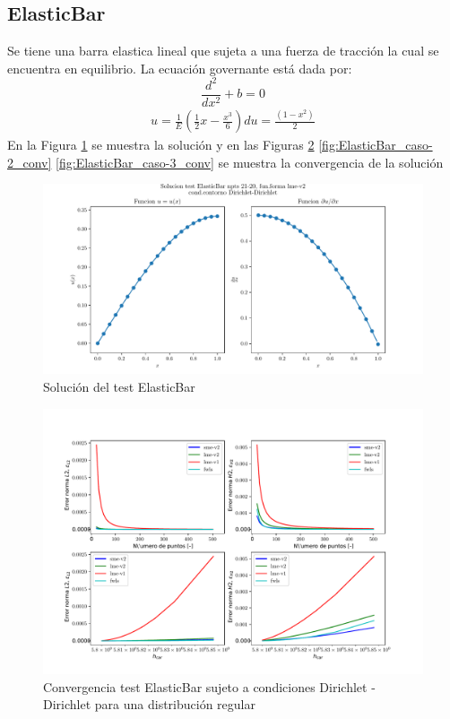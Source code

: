 \subsection{ElasticBar}
Se tiene una barra elastica lineal que sujeta a una fuerza de tracción la cual se encuentra en equilibrio. La ecuación governante está dada por:
\begin{equation}
    \frac{d^2}{dx^2} + b = 0
\end{equation}
\begin{eqnarray}
    u = \frac{1}{E} ( \frac{1}{2} x - \frac{x^3}{6})
    du = \frac{( 1 -x^2 )}{2}
\end{eqnarray}
En la Figura \ref{fig:ElasticBar_caso-1_sol} se muestra la solución y en las Figuras \ref{fig:ElasticBar_caso-1_conv} \ref{fig:ElasticBar_caso-2_conv} \ref{fig:ElasticBar_caso-3_conv} se muestra la convergencia de la solución
\begin{figure}
    \centering
    \includegraphics[width=1\textwidth]{./Imagenes/06/solucion/ElasticBar_21-20_regular_type-2_caso-1_lme-v2_direct_dgesv-lapack-blas.pdf}
    \caption{Solución del test ElasticBar} \label{fig:ElasticBar_caso-1_sol}
\end{figure}
\begin{figure}
    \centering
    \includegraphics[width=1\textwidth]{./Imagenes/06/comparacion_shp_regular/ElasticBar_regular_type-2_caso-1_direct_dgesv-lapack-blas_sme-v2_lme-v2_lme-v1_fwls.pdf}
    \caption{Convergencia test ElasticBar sujeto a condiciones Dirichlet - Dirichlet para una distribución regular} \label{fig:ElasticBar_caso-1_conv}
\end{figure}
